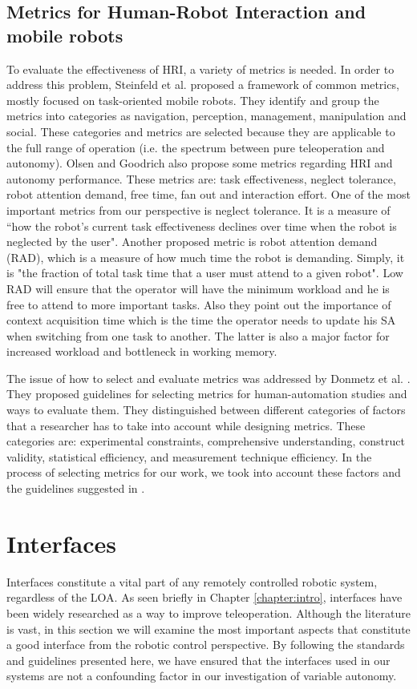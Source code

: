 \documentclass[a4paper,12pt,oneside,openright]{bhamthesis}
\begin{document}
\subsection{Metrics for Human-Robot Interaction and mobile robots}
To evaluate the effectiveness of HRI, a variety of metrics is needed. In order to address this problem, Steinfeld et al. \cite{Steinfeld2006} proposed a framework of common metrics, mostly focused on task-oriented mobile robots. They identify and group the metrics into categories as navigation, perception, management, manipulation and social. These categories and metrics are selected because they are applicable to the full range of operation (i.e. the spectrum between pure teleoperation and autonomy). Olsen and Goodrich \cite{Olsen2003} also propose some metrics regarding HRI and autonomy performance. These metrics are: task effectiveness, neglect tolerance, robot attention demand, free time, fan out and interaction effort. One of the most important metrics from our perspective is neglect tolerance. It is a measure of ``how the robot's current task effectiveness declines over time when the robot is neglected by the user". Another proposed metric is robot attention demand (RAD), which is a measure of how much time the robot is demanding. Simply, it is "the fraction of total task time that a user must attend to a given robot". Low RAD will ensure that the operator will have the minimum workload and he is free to attend to more important tasks. Also they point out the importance of context acquisition time which is the time the operator needs to update his SA when switching from one task to another. The latter is also a major factor for increased workload and bottleneck in working memory.

The issue of how to select and evaluate metrics was addressed by Donmetz et al. \cite{Donmez2008}. They proposed guidelines for selecting metrics for human-automation studies and ways to evaluate them. They distinguished between different categories of factors that a researcher has to take into account while designing metrics. These categories are: experimental constraints, comprehensive understanding, construct validity, statistical efficiency, and measurement technique efficiency. In the process of selecting metrics for our work, we took into account these factors and the guidelines suggested in \cite{Donmez2008}.

\section{Interfaces}\label{section:interfaces_lit}
Interfaces constitute a vital part of any remotely controlled robotic system, regardless of the LOA. As seen briefly in Chapter \ref{chapter:intro}, interfaces have been widely researched as a way to improve teleoperation. Although the literature is vast, in this section we will examine the most important aspects that constitute a good interface from the robotic control perspective. By following the standards and guidelines presented here, we have ensured that the interfaces used in our systems are not a confounding factor in our investigation of variable autonomy.
\end{document}
